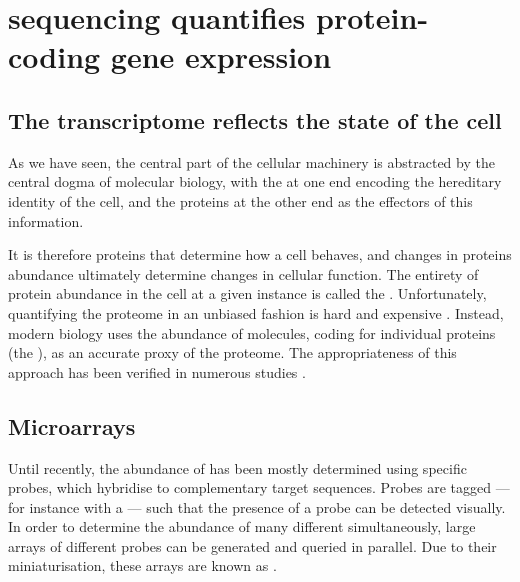 \section{ sequencing quantifies protein-coding gene expression}
\label{sec:rna}

\subsection{The transcriptome reflects the state of the cell}

As we have seen, the central part of the cellular machinery is abstracted by the
central dogma of molecular biology, with the \dna at one end encoding the
hereditary identity of the cell, and the proteins at the other end as the
effectors of this information.

It is therefore proteins that determine how a cell behaves, and changes in
proteins abundance ultimately determine changes in cellular function. The
entirety of protein abundance in the cell at a given instance is called the
. Unfortunately, quantifying the proteome in an unbiased
fashion is hard and expensive \citep{Graumann:2008}. Instead, modern biology
uses the abundance of \mrna molecules, coding for individual proteins (the
), as an accurate proxy of the proteome.
The appropriateness of this approach has been verified in numerous
studies \citep{Nagaraj:2011,Nookaew:2012}.

\subsection{Microarrays}

Until recently, the abundance of \mrna has been mostly determined using specific
probes, which hybridise to complementary target \mrna sequences. Probes are
tagged --- for instance with a  ---
such that the presence of a probe can be detected visually. In order to
determine the abundance of many different \mrna[s] simultaneously, large arrays
of different probes can be generated and queried in parallel. Due to their
miniaturisation, these arrays are known as 
\citep{Schena:1995}.

